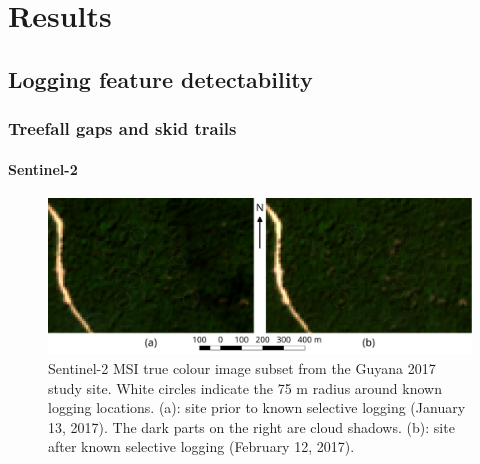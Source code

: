 \documentclass[a4paper,12pt]{scrbook}
\begin{document}
\chapter{Results}

\section{Logging feature detectability}

\subsection{Treefall gaps and skid trails}


\subsubsection{Sentinel-2}
\label{sec-treefall-sentinel2}

\begin{figure}
  \centering
  \includegraphics[width=\textwidth]{thesis-figures/02-guyana-sentinel2-tci}
  \caption{Sentinel-2 \ac{MSI} true colour image subset from the Guyana 2017 study site. White circles indicate the 75 m radius around known logging locations. (a): site prior to known selective logging (January 13, 2017). The dark parts on the right are cloud shadows. (b): site after known selective logging (February 12, 2017).}
  \label{fig-guyana-sentinel2-tci}
\end{figure}
\end{document}

